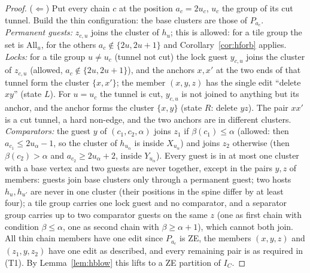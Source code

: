 \begin{proof}
($\Leftarrow$) Put every chain $c$ at the position $a_c=2u_c$, $u_c$ the group of its cut tunnel. Build the thin configuration: the base clusters are those of $P_{a_c}$. \emph{Permanent guests:} $z_{c,u}$ joins the cluster of $h_u$; this is allowed: for a tile group the set is $\mathrm{All}_u$, for the others $a_c\notin\{2u,2u+1\}$ and Corollary~\ref{cor:hforb} applies. \emph{Locks:} for a tile group $u\ne u_c$ (tunnel not cut) the lock guest $y_{c,u}$ joins the cluster of $z_{c,u}$ (allowed, $a_c\notin\{2u,2u+1\}$), and the anchors $x,x'$ at the two ends of that tunnel form the cluster $\{x,x'\}$; the member $(x,y,z)$ has the single edit ``delete $xy$'' (state $L$). For $u=u_c$ the tunnel is cut, $y_{c,u}$ is not joined to anything but its anchor, and the anchor forms the cluster $\{x,y\}$ (state $R$: delete $yz$). The pair $xx'$ is a cut tunnel, a hard non-edge, and the two anchors are in different clusters. \emph{Comparators:} the guest $y$ of $(c_1,c_2,\alpha)$ joins $z_1$ if $\beta(c_1)\le\alpha$ (allowed: then $a_{c_1}\le2u_\alpha-1$, so the cluster of $h_{u_\alpha}$ is inside $X_{u_\alpha}$) and joins $z_2$ otherwise (then $\beta(c_2)>\alpha$ and $a_{c_2}\ge2u_\alpha+2$, inside $Y_{u_\alpha}$). Every guest is in at most one cluster with a base vertex and two guests are never together, except in the pairs $y,z$ of members: guests join base clusters only through a permanent guest; two hosts $h_u,h_{u'}$ are never in one cluster (their positions in the spine differ by at least four); a tile group carries one lock guest and no comparator, and a separator group carries up to two comparator guests on the same $z$ (one as first chain with condition $\beta\le\alpha$, one as second chain with $\beta\ge\alpha+1$), which cannot both join. All thin chain members have one edit since $P_{a_c}$ is ZE, the members $(x,y,z)$ and $(z_1,y,z_2)$ have one edit as described, and every remaining pair is as required in (T1). By Lemma~\ref{lem:hblow} this lifts to a ZE partition of $I_C$.
\end{proof}

